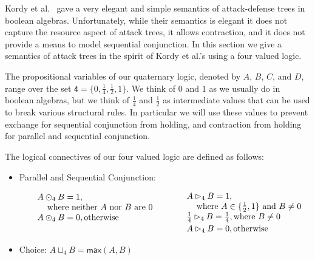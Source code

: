 \newcommand{\forth}{\frac{1}{4}}
\newcommand{\half}{\frac{1}{2}}

Kordy et al.~\cite{Kordy:2012} gave a very elegant and simple
semantics of attack-defense trees in boolean algebras.  Unfortunately,
while their semantics is elegant it does not capture the resource
aspect of attack trees, it allows contraction, and it does not provide
a means to model sequential conjunction.  In this section we give a
semantics of attack trees in the spirit of Kordy et al.'s using a four
valued logic.

The propositional variables of our quaternary logic, denoted by $A$, $B$,
$C$, and $D$, range over the set $\mathsf{4} = \{0, \forth, \half,
1\}$.  We think of $0$ and $1$ as we usually do in boolean algebras,
but we think of $\forth$ and $\half$ as intermediate values that can
be used to break various structural rules.  In particular we will use
these values to prevent exchange for sequential conjunction from
holding, and contraction from holding for parallel and sequential
conjunction.
\begin{definition}
  \label{def:logical-connectives}
  The logical connectives of our four valued logic are defined as
  follows:
  \begin{itemize}
  \item[] Parallel and Sequential Conjunction:
    \begin{center}
      \begin{math}
        \setlength{\arraycolsep}{10px}
        \begin{array}{lll}
          \begin{array}{lll}
            A \odot_4 B = 1,\\
            \,\,\,\,\,\,\,\text{where neither $A$ nor $B$ are $0$}\\
          A \odot_4 B = 0, \text{otherwise}\\
          \\
        \end{array}
        &
        \begin{array}{lll}          
          A \rhd_4 B = 1,\\
          \,\,\,\,\,\,\,\text{where } A \in \{\half, 1\} \text{ and } B \neq 0\\
          \forth \rhd_4 B = \forth, \text{where $B \neq 0$}\\[2px]         
          A \rhd_4 B = 0, \text{otherwise}
        \end{array}
        \end{array}
      \end{math}
    \end{center}
  \item[] Choice: $A \sqcup_4 B = \mathsf{max}(A,B)$    
  \end{itemize}
\end{definition}
